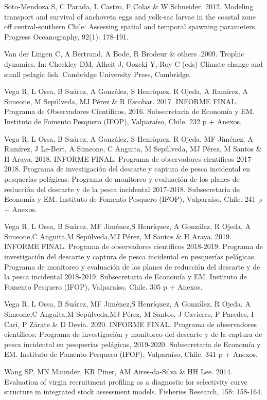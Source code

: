 \documentclass[
  spanish,
]{article}
\begin{document}
Soto-Mendoza S, C Parada, L Castro, F Colas \& W Schneider. 2012.
Modeling transport and survival of anchoveta eggs and yolk-sac larvae in
the coastal zone off central-southern Chile: Assessing spatial and
temporal spawning parameters. Progress Oceanography, 92(1): 178-191.

Van der Lingen C, A Bertrand, A Bode, R Brodeur \& others .2009. Trophic
dynamics. In: Checkley DM, Alheit J, Oozeki Y, Roy C (eds) Climate
change and small pelagic fish. Cambridge University Press, Cambridge.

Vega R, L Ossa, B Suárez, A González, S Henríquez, R Ojeda, A Ramírez, A
Simeone, M Sepúlveda, MJ Pérez \& R Escobar. 2017. INFORME FINAL.
Programa de Observadores Científicos, 2016. Subsecretaria de Economía y
EM. Instituto de Fomento Pesquero (IFOP), Valparaíso, Chile. 232 p +
Anexos.

Vega R, L Ossa, B Suárez, A González, S Henríquez, R Ojeda, MF Jiménez,
A Ramírez, J Le-Bert, A Simeone, C Anguita, M Sepúlveda, MJ Pérez, M
Santos \& H Araya. 2018. INFORME FINAL. Programa de observadores
científicos 2017-2018. Programa de investigación del descarte y captura
de pesca incidental en pesquerías pelágicas. Programa de monitoreo y
evaluación de los planes de reducción del descarte y de la pesca
incidental 2017-2018. Subsecretaria de Economía y EM. Instituto de
Fomento Pesquero (IFOP), Valparaíso, Chile. 241 p + Anexos.

Vega R, L Ossa, B Suárez, MF Jiménez,S Henríquez, A González, R Ojeda, A
Simeone,C Anguita,M Sepúlveda,MJ Pérez, M Santos \& H Araya. 2019.
INFORME FINAL. Programa de observadores científicos 2018-2019. Programa
de investigación del descarte y captura de pesca incidental en
pesquerías pelágicas. Programa de monitoreo y evaluación de los planes
de reducción del descarte y de la pesca incidental 2018-2019.
Subsecretaria de Economía y EM. Instituto de Fomento Pesquero (IFOP),
Valparaíso, Chile. 305 p + Anexos.

Vega R, L Ossa, B Suárez, MF Jiménez,S Henríquez, A González, R Ojeda, A
Simeone,C Anguita,M Sepúlveda,MJ Pérez, M Santos, J Cavieres, P Paredes,
I Cari, P Zárate \& D Devia. 2020. INFORME FINAL. Programa de
observadores científicos: Programa de investigación y monitoreo del
descarte y de la captura de pesca incidental en pesquerías pelágicas,
2019-2020. Subsecretaria de Economía y EM. Instituto de Fomento Pesquero
(IFOP), Valparaíso, Chile. 341 p + Anexos.

Wang SP, MN Maunder, KR Piner, AM Aires-da-Silva \& HH Lee. 2014.
Evaluation of virgin recruitment profiling as a diagnostic for
selectivity curve structure in integrated stock assessment models.
Fisheries Research, 158: 158-164.
\end{document}
